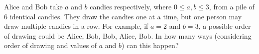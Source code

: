 Alice and Bob take $a$ and $b$ candies respectively, where $0\leq a,b\leq3$, from a pile of $6$ identical candies. They draw the candies one at a time, but one person may draw multiple candies in a row. For example, if $a=2$ and $b=3$, a possible order of drawing could be Alice, Bob, Bob, Alice, Bob. In how many ways (considering order of drawing and values of $a$ and $b$) can this happen?